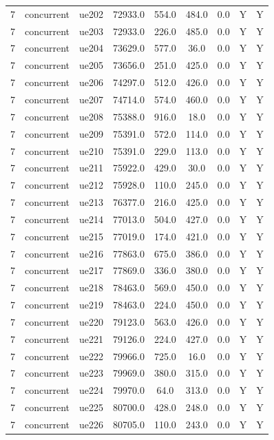 \begin{table}[ht]
\begin{tabular}{|c|c|c|c|c|c|c|c|c|}
7 & concurrent & ue202 & 72933.0 & 554.0 & 484.0 & 0.0 & Y & Y \\
7 & concurrent & ue203 & 72933.0 & 226.0 & 485.0 & 0.0 & Y & Y \\
7 & concurrent & ue204 & 73629.0 & 577.0 & 36.0 & 0.0 & Y & Y \\
7 & concurrent & ue205 & 73656.0 & 251.0 & 425.0 & 0.0 & Y & Y \\
7 & concurrent & ue206 & 74297.0 & 512.0 & 426.0 & 0.0 & Y & Y \\
7 & concurrent & ue207 & 74714.0 & 574.0 & 460.0 & 0.0 & Y & Y \\
7 & concurrent & ue208 & 75388.0 & 916.0 & 18.0 & 0.0 & Y & Y \\
7 & concurrent & ue209 & 75391.0 & 572.0 & 114.0 & 0.0 & Y & Y \\
7 & concurrent & ue210 & 75391.0 & 229.0 & 113.0 & 0.0 & Y & Y \\
7 & concurrent & ue211 & 75922.0 & 429.0 & 30.0 & 0.0 & Y & Y \\
7 & concurrent & ue212 & 75928.0 & 110.0 & 245.0 & 0.0 & Y & Y \\
7 & concurrent & ue213 & 76377.0 & 216.0 & 425.0 & 0.0 & Y & Y \\
7 & concurrent & ue214 & 77013.0 & 504.0 & 427.0 & 0.0 & Y & Y \\
7 & concurrent & ue215 & 77019.0 & 174.0 & 421.0 & 0.0 & Y & Y \\
7 & concurrent & ue216 & 77863.0 & 675.0 & 386.0 & 0.0 & Y & Y \\
7 & concurrent & ue217 & 77869.0 & 336.0 & 380.0 & 0.0 & Y & Y \\
7 & concurrent & ue218 & 78463.0 & 569.0 & 450.0 & 0.0 & Y & Y \\
7 & concurrent & ue219 & 78463.0 & 224.0 & 450.0 & 0.0 & Y & Y \\
7 & concurrent & ue220 & 79123.0 & 563.0 & 426.0 & 0.0 & Y & Y \\
7 & concurrent & ue221 & 79126.0 & 224.0 & 427.0 & 0.0 & Y & Y \\
7 & concurrent & ue222 & 79966.0 & 725.0 & 16.0 & 0.0 & Y & Y \\
7 & concurrent & ue223 & 79969.0 & 380.0 & 315.0 & 0.0 & Y & Y \\
7 & concurrent & ue224 & 79970.0 & 64.0 & 313.0 & 0.0 & Y & Y \\
7 & concurrent & ue225 & 80700.0 & 428.0 & 248.0 & 0.0 & Y & Y \\
7 & concurrent & ue226 & 80705.0 & 110.0 & 243.0 & 0.0 & Y & Y \\

\end{tabular}
\end{table}
